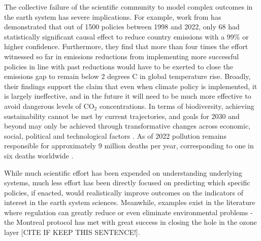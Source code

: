 \documentclass[12pt,a4paper]{article}
\begin{document}
The collective failure of the scientific community to model complex outcomes in the earth system has severe implications. For example, work from  has demonstrated that out of 1500 policies between 1998 and 2022, only 68 had statistically significant causal effect to reduce country emissions with a 99\% or higher confidence. Furthermore, they find that more than four times the effort witnessed so far in emissions reductions from implementing more successful policies in line with past reductions would have to be exerted to close the emissions gap to remain below 2 degrees C in global temperature rise. Broadly, their findings support the claim that even when climate policy is implemented, it is largely ineffective, and in the future it will need to be much more effective to avoid dangerous levels of CO$_2$ concentrations. In terms of biodiversity,  achieving sustainability cannot be met by current trajectories, and goals for 2030 and beyond may only be achieved through transformative changes across economic, social, political and technological factors . As of 2022 pollution remains responsible for approximately 9 million deaths per year, corresponding to one in six deaths worldwide .

While much scientific effort has been expended on understanding underlying systems, much less effort has been directly focused on predicting which specific policies, if enacted, would realistically improve outcomes on the indicators of interest in the earth system sciences. Meanwhile, examples exist in the literature where regulation can greatly reduce or even eliminate environmental problems - the Montreal protocol has met with great success in closing the hole in the ozone layer [CITE IF KEEP THIS SENTENCE!]. 
\end{document}
